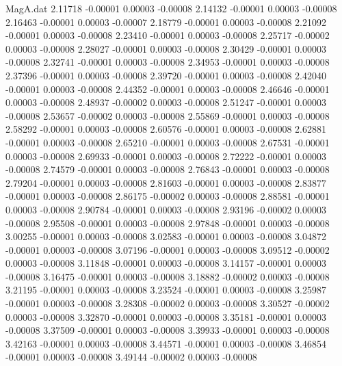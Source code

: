 \begin{filecontents}{MagA.dat}
   2.11718   -0.00001    0.00003   -0.00008
   2.14132   -0.00001    0.00003   -0.00008
   2.16463   -0.00001    0.00003   -0.00007
   2.18779   -0.00001    0.00003   -0.00008
   2.21092   -0.00001    0.00003   -0.00008
   2.23410   -0.00001    0.00003   -0.00008
   2.25717   -0.00002    0.00003   -0.00008
   2.28027   -0.00001    0.00003   -0.00008
   2.30429   -0.00001    0.00003   -0.00008
   2.32741   -0.00001    0.00003   -0.00008
   2.34953   -0.00001    0.00003   -0.00008
   2.37396   -0.00001    0.00003   -0.00008
   2.39720   -0.00001    0.00003   -0.00008
   2.42040   -0.00001    0.00003   -0.00008
   2.44352   -0.00001    0.00003   -0.00008
   2.46646   -0.00001    0.00003   -0.00008
   2.48937   -0.00002    0.00003   -0.00008
   2.51247   -0.00001    0.00003   -0.00008
   2.53657   -0.00002    0.00003   -0.00008
   2.55869   -0.00001    0.00003   -0.00008
   2.58292   -0.00001    0.00003   -0.00008
   2.60576   -0.00001    0.00003   -0.00008
   2.62881   -0.00001    0.00003   -0.00008
   2.65210   -0.00001    0.00003   -0.00008
   2.67531   -0.00001    0.00003   -0.00008
   2.69933   -0.00001    0.00003   -0.00008
   2.72222   -0.00001    0.00003   -0.00008
   2.74579   -0.00001    0.00003   -0.00008
   2.76843   -0.00001    0.00003   -0.00008
   2.79204   -0.00001    0.00003   -0.00008
   2.81603   -0.00001    0.00003   -0.00008
   2.83877   -0.00001    0.00003   -0.00008
   2.86175   -0.00002    0.00003   -0.00008
   2.88581   -0.00001    0.00003   -0.00008
   2.90784   -0.00001    0.00003   -0.00008
   2.93196   -0.00002    0.00003   -0.00008
   2.95508   -0.00001    0.00003   -0.00008
   2.97848   -0.00001    0.00003   -0.00008
   3.00255   -0.00001    0.00003   -0.00008
   3.02583   -0.00001    0.00003   -0.00008
   3.04872   -0.00001    0.00003   -0.00008
   3.07196   -0.00001    0.00003   -0.00008
   3.09512   -0.00002    0.00003   -0.00008
   3.11848   -0.00001    0.00003   -0.00008
   3.14157   -0.00001    0.00003   -0.00008
   3.16475   -0.00001    0.00003   -0.00008
   3.18882   -0.00002    0.00003   -0.00008
   3.21195   -0.00001    0.00003   -0.00008
   3.23524   -0.00001    0.00003   -0.00008
   3.25987   -0.00001    0.00003   -0.00008
   3.28308   -0.00002    0.00003   -0.00008
   3.30527   -0.00002    0.00003   -0.00008
   3.32870   -0.00001    0.00003   -0.00008
   3.35181   -0.00001    0.00003   -0.00008
   3.37509   -0.00001    0.00003   -0.00008
   3.39933   -0.00001    0.00003   -0.00008
   3.42163   -0.00001    0.00003   -0.00008
   3.44571   -0.00001    0.00003   -0.00008
   3.46854   -0.00001    0.00003   -0.00008
   3.49144   -0.00002    0.00003   -0.00008

\end{filecontents}
